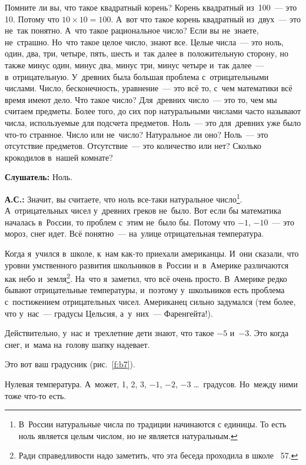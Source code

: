 Помните ли вы, что такое квадратный корень? Корень квадратный из~100~--- это 10. Потому что
$10\times 10=100$. А~вот что такое корень квадратный из~двух~--- это не~так понятно. А~что такое
рациональное число? Если вы не~знаете, не~страшно. Но~что такое целое число, знают все. Целые
числа~--- это ноль, один, два, три, четыре, пять, шесть и~так далее в~положительную сторону, но
также минус один, минус два, минус три, минус четыре и~так далее~--- в~отрицательную. У~древних
была большая проблема с~отрицательными числами. Число, бесконечность, уравнение~--- это всё то,
с~чем математики всё время имеют дело. Что такое число? Для~древних число~--- это то, чем мы считаем предметы.
Более того, до сих пор натуральными числами часто называют числа, используемые для подсчета предметов.
Ноль~--- это для~древних уже было что-то странное. Число или не~число? Натуральное ли оно? Ноль~--- это отсутствие предметов.
 Отсутствие~--- это количество или нет? Сколько крокодилов в~нашей
комнате?

\textbf{Слушатель:} Ноль.

\textbf{А.С.:} Значит, вы считаете, что ноль все-таки натуральное число\footnote{В~России
натуральные числа по традиции начинаются с единицы. То есть ноль является целым числом, но не
является натуральным.}. А~отрицательных чисел у~древних греков не~было. Вот если бы математика
началась в~России, то проблем с~этим не~было бы. Потому что $-1$, $-10$~--- это мороз, снег идет. Всё
понятно~--- на~улице отрицательная температура.

Когда я~учился в~школе, к~нам как-то приехали американцы. И~они сказали, что уровни умственного
развития школьников в~России и~в~Америке различаются как небо и~земля\footnote{Ради справедливости надо заметить, что эта беседа проходила в школе \No~57.}.
 На~что я~заметил, что всё
очень просто. В~Америке редко бывают отрицательные температуры, и~поэтому у~школьников есть
проблема с~постижением отрицательных чисел. Американец сильно задумался (тем более, что у~нас~---
градусы Цельсия, а~у~них~--- Фаренгейта!).

Действительно, у~нас и~трехлетние дети знают, что такое $-5$ и~$-3$. Это когда снег, и~мама на~голову
шапку надевает.


Это вот ваш градусник (рис.~\ref{f:b7}).

Нулевая температура. А~может, 1, 2, 3, $-1$, $-2$, $-3$ \ldots\ градусов. Но~между ними тоже что-то есть.

